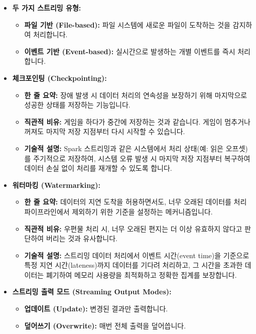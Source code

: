 \documentclass[11pt,a4paper]{article}
\begin{document}
\begin{itemize}
    \item \textbf{두 가지 스트리밍 유형:}
    \begin{itemize}
        \item \textbf{파일 기반 (File-based):} 파일 시스템에 새로운 파일이 도착하는 것을 감지하여 처리합니다.
        \item \textbf{이벤트 기반 (Event-based):} 실시간으로 발생하는 개별 이벤트를 즉시 처리합니다.
    \end{itemize}
    \item \textbf{체크포인팅 (Checkpointing):}
    \begin{itemize}
        \item \textbf{한 줄 요약:} 장애 발생 시 데이터 처리의 연속성을 보장하기 위해 마지막으로 성공한 상태를 저장하는 기능입니다.
        \item \textbf{직관적 비유:} 게임을 하다가 중간에 저장하는 것과 같습니다. 게임이 멈추거나 꺼져도 마지막 저장 지점부터 다시 시작할 수 있습니다.
        \item \textbf{기술적 설명:} Spark 스트리밍과 같은 시스템에서 처리 상태(예: 읽은 오프셋)를 주기적으로 저장하여, 시스템 오류 발생 시 마지막 저장 지점부터 복구하여 데이터 손실 없이 처리를 재개할 수 있도록 합니다.
    \end{itemize}
    \item \textbf{워터마킹 (Watermarking):}
    \begin{itemize}
        \item \textbf{한 줄 요약:} 데이터의 지연 도착을 허용하면서도, 너무 오래된 데이터를 처리 파이프라인에서 제외하기 위한 기준을 설정하는 메커니즘입니다.
        \item \textbf{직관적 비유:} 우편물 처리 시, 너무 오래된 편지는 더 이상 유효하지 않다고 판단하여 버리는 것과 유사합니다.
        \item \textbf{기술적 설명:} 스트리밍 데이터 처리에서 이벤트 시간(event time)을 기준으로 특정 지연 시간(lateness)까지 데이터를 기다려 처리하고, 그 시간을 초과한 데이터는 폐기하여 메모리 사용량을 최적화하고 정확한 집계를 보장합니다.
    \end{itemize}
    \item \textbf{스트리밍 출력 모드 (Streaming Output Modes):}
    \begin{itemize}
        \item \textbf{업데이트 (Update):} 변경된 결과만 출력합니다.
        \item \textbf{덮어쓰기 (Overwrite):} 매번 전체 출력을 덮어씁니다.

\end{itemize}
\end{itemize}
\end{document}
